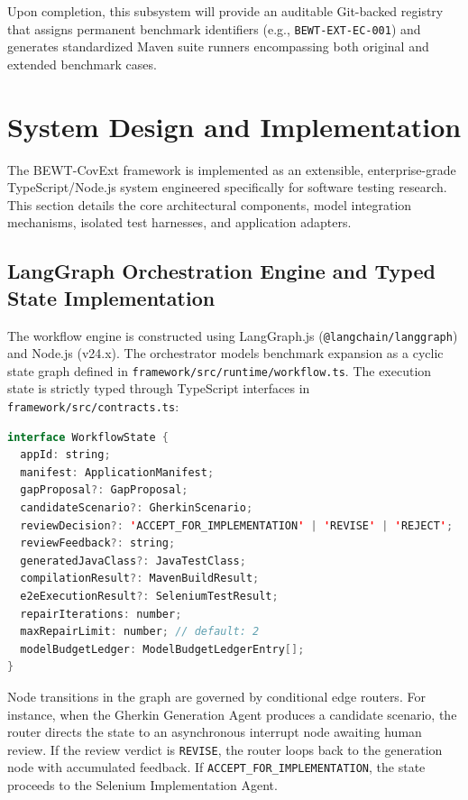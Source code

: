 \documentclass[pdflatex,sn-mathphys-num]{sn-jnl}
\begin{document}
Upon completion, this subsystem will provide an auditable Git-backed registry that assigns permanent benchmark identifiers (e.g., \texttt{BEWT-EXT-EC-001}) and generates standardized Maven suite runners encompassing both original and extended benchmark cases.


\section{System Design and Implementation}\label{sec:implementation}

The BEWT-CovExt framework is implemented as an extensible, enterprise-grade TypeScript/Node.js system engineered specifically for software testing research. This section details the core architectural components, model integration mechanisms, isolated test harnesses, and application adapters.

\subsection{LangGraph Orchestration Engine and Typed State Implementation}

The workflow engine is constructed using LangGraph.js (\texttt{@langchain/langgraph}) and Node.js (v24.x). The orchestrator models benchmark expansion as a cyclic state graph defined in \texttt{framework/src/runtime/workflow.ts}. The execution state is strictly typed through TypeScript interfaces in \texttt{framework/src/contracts.ts}:
\begin{lstlisting}[language=Java, basicstyle=\ttfamily\scriptsize, breaklines=true, frame=single, caption={Typed state schema contract in BEWT-CovExt (\texttt{contracts.ts}).}]
interface WorkflowState {
  appId: string;
  manifest: ApplicationManifest;
  gapProposal?: GapProposal;
  candidateScenario?: GherkinScenario;
  reviewDecision?: 'ACCEPT_FOR_IMPLEMENTATION' | 'REVISE' | 'REJECT';
  reviewFeedback?: string;
  generatedJavaClass?: JavaTestClass;
  compilationResult?: MavenBuildResult;
  e2eExecutionResult?: SeleniumTestResult;
  repairIterations: number;
  maxRepairLimit: number; // default: 2
  modelBudgetLedger: ModelBudgetLedgerEntry[];
}
\end{lstlisting}

Node transitions in the graph are governed by conditional edge routers. For instance, when the Gherkin Generation Agent produces a candidate scenario, the router directs the state to an asynchronous interrupt node awaiting human review. If the review verdict is \texttt{REVISE}, the router loops back to the generation node with accumulated feedback. If \texttt{ACCEPT\_FOR\_IMPLEMENTATION}, the state proceeds to the Selenium Implementation Agent.
\end{document}
